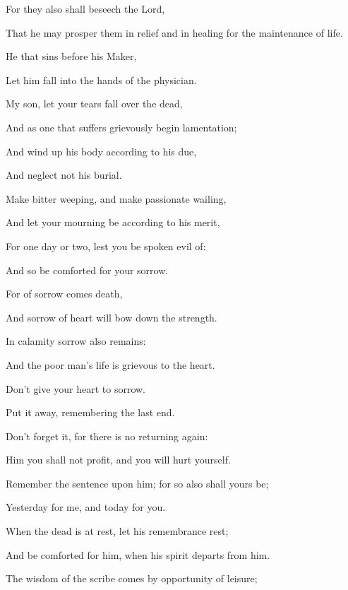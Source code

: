 {\par }{\Q {}For they also shall beseech the Lord,
\par }{\Q That he may prosper them in
{} relief and in healing for the maintenance of life.
\par }{\Q {}He that sins before his Maker,
\par }{\Q Let him fall into the hands of the physician.
\par }{\BB \par }{\Q {}My son, let your tears fall over the dead,
\par }{\Q And as one that suffers grievously begin lamentation;
\par }{\Q And wind up his body according to his due,
\par }{\Q And neglect not his burial.
\par }{\Q {}Make bitter weeping, and make passionate wailing,
\par }{\Q And let your mourning be according to his merit,
\par }{\Q For one day or two, lest you be spoken evil of:
\par }{\Q And so be comforted for your sorrow.
\par }{\Q {}For of sorrow comes death,
\par }{\Q And sorrow of heart will bow down the strength.
\par }{\Q {}In calamity sorrow also remains:
\par }{\Q And the poor man’s life is
 grievous to the heart.
\par }{\Q {}Don’t give your heart to sorrow.
\par }{\Q Put it away, remembering the last end.
\par }{\Q {}Don’t forget it, for there is no returning again:
\par }{\Q Him you shall not profit, and you will hurt yourself.
\par }{\Q {}Remember the sentence upon him; for so also shall yours be;
\par }{\Q Yesterday for me, and today for you.
\par }{\Q {}When the dead is at rest, let his remembrance rest;
\par }{\Q And be comforted for him, when his spirit departs from him.
\par }{\BB \par }{\Q {}The wisdom of the scribe comes by opportunity of leisure;
}
